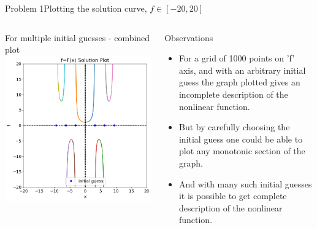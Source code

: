 \documentclass{beamer}
\begin{document}
\begin{frame}{Problem 1}{Plotting the solution curve, $f\in[-20,20]$}
    \vspace{-2.5em}
    \begin{columns}
        \begin{block}{\footnotesize For multiple initial guesses - combined plot}
            \includegraphics[width=\textwidth]{Figures/prob1_pltsol2.png}
        \end{block}
        \begin{block}{\footnotesize Observations }
            \footnotesize
            \begin{itemize}
                \item For a grid of 1000 points on 'f' axis, and with an arbitrary initial guess the graph plotted gives an incomplete description of the nonlinear function.
                \item But by carefully choosing the initial guess one could be able to plot any monotonic section of the graph.
                \item And with many such initial guesses it is possible to get complete description of the nonlinear function.
            \end{itemize}
        \end{block}
    \end{columns}
\end{frame}
\end{document}
